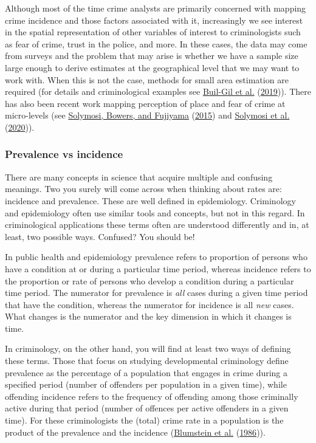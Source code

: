 \documentclass[
]{book}
\begin{document}
Although most of the time crime analysts are primarily concerned with mapping crime incidence and those factors associated with it, increasingly we see interest in the spatial representation of other variables of interest to criminologists such as fear of crime, trust in the police, and more. In these cases, the data may come from surveys and the problem that may arise is whether we have a sample size large enough to derive estimates at the geographical level that we may want to work with. When this is not the case, methods for small area estimation are required (for details and criminological examples see \protect\hyperlink{ref-Buil_2019}{Buil-Gil et al.} (\protect\hyperlink{ref-Buil_2019}{2019})). There has also been recent work mapping perception of place and fear of crime at micro-levels (see \protect\hyperlink{ref-Solymosi_2015}{Solymosi, Bowers, and Fujiyama} (\protect\hyperlink{ref-Solymosi_2015}{2015}) and \protect\hyperlink{ref-Solymosi_2020}{Solymosi et al.} (\protect\hyperlink{ref-Solymosi_2020}{2020})).

\hypertarget{prevalence-vs-incidence}{%
\subsubsection{Prevalence vs incidence}\label{prevalence-vs-incidence}}

There are many concepts in science that acquire multiple and confusing meanings. Two you surely will come across when thinking about rates are: incidence and prevalence. These are well defined in epidemiology. Criminology and epidemiology often use similar tools and concepts, but not in this regard. In criminological applications these terms often are understood differently and in, at least, two possible ways. Confused? You should be!

In public health and epidemiology prevalence refers to proportion of persons who have a condition at or during a particular time period, whereas incidence refers to the proportion or rate of persons who develop a condition during a particular time period. The numerator for prevalence is \emph{all} cases during a given time period that have the condition, whereas the numerator for incidence is all \emph{new} cases. What changes is the numerator and the key dimension in which it changes is time.

In criminology, on the other hand, you will find at least two ways of defining these terms. Those that focus on studying developmental criminology define prevalence as the percentage of a population that engages in crime during a specified period (number of offenders per population in a given time), while offending incidence refers to the frequency of offending among those criminally active during that period (number of offences per active offenders in a given time). For these criminologists the (total) crime rate in a population is the product of the prevalence and the incidence (\protect\hyperlink{ref-Blumstein_1986}{Blumstein et al.} (\protect\hyperlink{ref-Blumstein_1986}{1986})).
\end{document}
